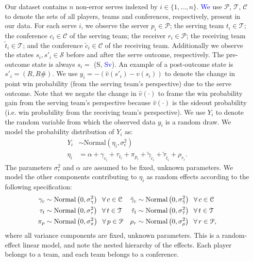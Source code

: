 \documentclass[USenglish]{article}
\theoremstyle{dgthm}
\theoremstyle{dgdef}
\begin{document}
Our dataset contains $n$ non-error serves indexed by $i \in \{1, ..., n\}$. \textcolor{blue}{We} use $\mathcal{P}$, $\mathcal{T}$, $\mathcal{C}$ to denote the sets of all players, teams and conferences, respectively, present in our data. For each serve $i$, we observe the server $p_i \in \mathcal{P}$; the serving team $t_i \in \mathcal{T}$; the conference $c_i \in \mathcal{C}$ of the serving team; the receiver $r_i \in \mathcal{P}$; the receiving team $\tilde t_i \in \mathcal{T}$; and the conference $\tilde c_i \in \mathcal{C}$ of the receiving team. Additionally we observe the states $s_i, s'_i \in \mathcal{S}$ before and after the serve outcome, respectively. The pre-outcome state is always $s_i =$ (S, \textcolor{blue}{Sv}). An example of a post-outcome state is $s'_i = (R, R\#)$. We use $y_i = -(\hat v(s'_i) - \hat v(s_i))$ to denote the change in point win probability (from the serving team's perspective) due to the serve outcome. Note that we negate the change in $\hat v(\cdot)$ to frame the win probability gain from the serving team's perspective because $\hat v(\cdot)$ is the sideout probability (i.e. win probability from the receiving team's perspective). We use $Y_i$ to denote the random variable from which the observed data $y_i$ is a random draw. We model the probability distribution of $Y_i$ as:
\begin{align*}
  Y_i &\sim \mbox{Normal}(\eta_i, \sigma^2_\epsilon)\\
  \eta_i &= \alpha + \gamma_{c_i} + \tau_{t_i} + \pi_{p_i} + \tilde\gamma_{\tilde c_i} + \tilde\tau_{\tilde t_i} + \rho_{r_i}.
\end{align*}
The parameters $\sigma^2_\epsilon$ and $\alpha$ are assumed to be fixed, unknown parameters. We model the other components contributing to $\eta_i$ as random effects according to the following specification:
\begin{align*}
  \gamma_c &\sim \mbox{Normal}\left(0, \sigma^2_\gamma\right) \hspace{2mm} \forall\, c \in \mathcal{C} &
  \tilde\gamma_c &\sim \mbox{Normal}\left(0, \sigma^2_{\tilde\gamma}\right) \hspace{2mm} \forall\, c \in \mathcal{C} \\
  \tau_t &\sim \mbox{Normal}\left(0, \sigma^2_\tau\right) \hspace{2mm} \forall\, t \in \mathcal{T} &
  \tilde\tau_t &\sim \mbox{Normal}\left(0, \sigma^2_{\tilde\tau}\right) \hspace{2mm} \forall\, t \in \mathcal{T} \\
  \pi_p &\sim \mbox{Normal}\left(0, \sigma^2_\pi\right) \hspace{2mm} \forall\, p \in \mathcal{P} &
  \rho_r &\sim \mbox{Normal}\left(0, \sigma^2_\rho\right) \hspace{2mm} \forall\, r \in \mathcal{P},
\end{align*}
where all variance components are fixed, unknown parameters. This is a random-effect linear model, and note the nested hierarchy of the effects. Each player belongs to a team, and each team belongs to a conference.
\end{document}
